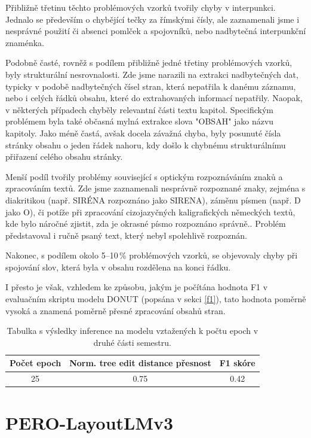 \documentclass{article}
\begin{document}
Přibližně třetinu těchto problémových vzorků tvořily chyby v interpunkci. Jednalo se především o chybějící tečky za římskými čísly, ale zaznamenali jsme i nesprávné použití či absenci pomlček a spojovníků, nebo nadbytečná interpunkční znaménka.

Podobně časté, rovněž s podílem přibližně jedné třetiny problémových vzorků, byly strukturální nesrovnalosti. Zde jsme narazili na extrakci nadbytečných dat, typicky v podobě nadbytečných čísel stran, která nepatřila k danému záznamu, nebo i celých řádků obsahu, které do extrahovaných informací nepatřily. Naopak, v některých případech chyběly relevantní části textu kapitol. Specifickým problémem byla také občasná mylná extrakce slova "OBSAH" jako názvu kapitoly. Jako méně častá, avšak docela závažná chyba, byly posunuté čísla stránky obsahu o jeden řádek nahoru, kdy došlo k chybnému strukturálnímu přiřazení celého obsahu stránky.

Menší podíl tvořily problémy související s optickým rozpoznáváním znaků a zpracováním textů. Zde jsme zaznamenali nesprávně rozpoznané znaky, zejména s diakritikou (např. SIRÉNA rozpoznáno jako SIRENA), záměnu písmen (např. D jako O), či potíže při zpracování cizojazyčných kaligrafických německých textů, kde bylo náročné zjistit, zda je okrasné písmo rozpoznáno správně.. Problém představoval i ručně psaný text, který nebyl spolehlivě rozpoznán.

Nakonec, s podílem okolo 5--10\,\% problémových vzorků, se objevovaly chyby při spojování slov, která byla v obsahu rozdělena na konci řádku.

I přesto je však, vzhledem ke způsobu, jakým je počítána hodnota F1 v evaluačním skriptu modelu DONUT (popsána v sekci \ref{f1}), tato hodnota poměrně vysoká a znamená poměrně přesné zpracování obsahů stran.

\begin{table}[ht]
\centering
\begin{tabular}{c||cc}
\hline
\textbf{Počet epoch} & \textbf{Norm. tree edit distance přesnost} & \textbf{F1 skóre} \\
\hline
25 & 0.75 & 0.42 \\
\hline
\end{tabular}
\caption{Tabulka s výsledky inference na modelu vztažených k počtu epoch v druhé části semestru.}
\label{tab:dataset_info_2}
\end{table}


\section{PERO-LayoutLMv3}
\end{document}

